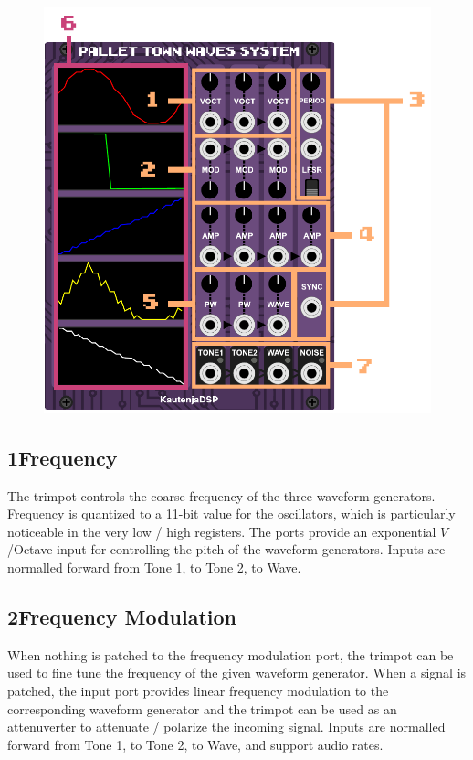 \documentclass[12pt,letter]{article}
\begin{document}
\begin{figure}[!htp]
\centering
\includegraphics{Interface}
\end{figure}

\subsection*{1{\quad}Frequency}

The trimpot controls the coarse frequency of the three waveform generators. Frequency is quantized to a 11-bit value for the oscillators, which is particularly noticeable in the very low / high registers. The ports provide an exponential $V$/Octave input for controlling the pitch of the waveform generators. Inputs are normalled forward from Tone 1, to Tone 2, to Wave.

\subsection*{2{\quad}Frequency Modulation}

When nothing is patched to the frequency modulation port, the trimpot can be used to fine tune the frequency of the given waveform generator. When a signal is patched, the input port provides linear frequency modulation to the corresponding waveform generator and the trimpot can be used as an attenuverter to attenuate / polarize the incoming signal. Inputs are normalled forward from Tone 1, to Tone 2, to Wave, and support audio rates.
\end{document}
